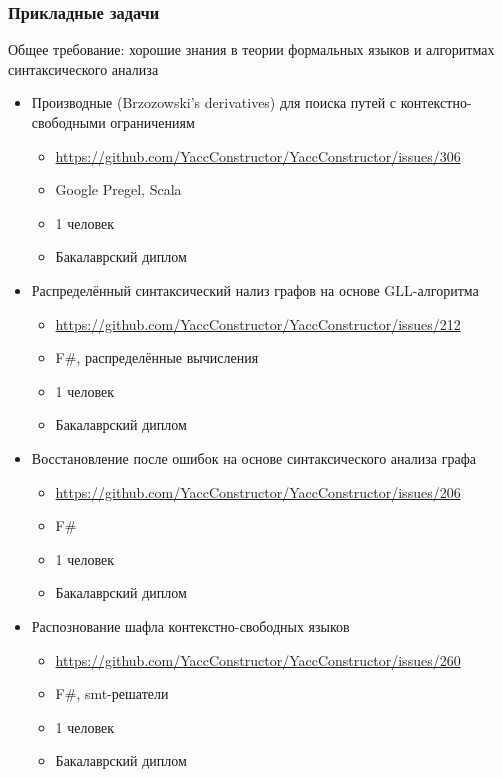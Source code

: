 \documentclass{beamer}
\begin{document}
\begin{frame}[fragile]
\transwipe[direction=90]
\frametitle{Прикладные задачи}
  Общее требование: хорошие знания в теории формальных языков и алгоритмах синтаксического анализа
  \begin{itemize}
    \item Производные (Brzozowski’s derivatives) для поиска путей с контекстно-свободными 
    ограничениям
    \begin{itemize}
       \item \footnotesize{\url{https://github.com/YaccConstructor/YaccConstructor/issues/306}}
       \item Google Pregel, Scala
       \item 1 человек
       \item Бакалаврский диплом
    \end{itemize}
    \item Распределённый синтаксический нализ графов на основе GLL-алгоритма
    \begin{itemize}
       \item \footnotesize{\url{https://github.com/YaccConstructor/YaccConstructor/issues/212}}
       \item F\#, распределённые вычисления
       \item 1 человек
       \item Бакалаврский диплом
    \end{itemize}
    \item Восстановление после ошибок на основе синтаксического анализа графа
    \begin{itemize}
       \item \footnotesize{\url{https://github.com/YaccConstructor/YaccConstructor/issues/206}}
       \item F\#
       \item 1 человек
       \item Бакалаврский диплом
    \end{itemize}
    \item Распознование шафла контекстно-свободных языков
    \begin{itemize}
       \item \footnotesize{\url{https://github.com/YaccConstructor/YaccConstructor/issues/260}}
       \item F\#, smt-решатели
       \item 1 человек
       \item Бакалаврский диплом
    \end{itemize}
  \end{itemize}  
\end{frame}
\end{document}
